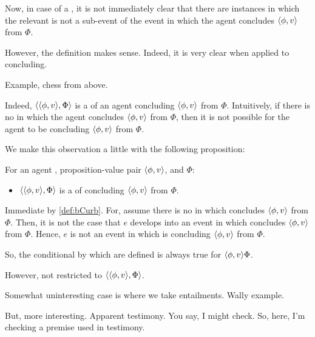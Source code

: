 \begin{note}
  Now, in case of a \bCurb{}, it is not immediately clear that there are instances in which the relevant \pevent{} is not a sub-event of the event in which the agent concludes \(\langle \phi, v \rangle\) from \(\Phi\).

  However, the definition makes sense.
  Indeed, it is very clear when applied to concluding.
\end{note}


\begin{note}
  Example, chess from above.
\end{note}

\begin{note}
  Indeed, \(\langle \langle \phi, v \rangle, \Phi \rangle\) is a \bCurb{} of an agent concluding \(\langle \phi, v \rangle\) from \(\Phi\).
  Intuitively, if there is no \pevent{} in which the agent concludes \(\langle \phi, v \rangle\) from \(\Phi\), then it is not possible for the agent to be concluding \(\langle \phi, v \rangle\) from \(\Phi\).

  We make this observation a little with the following proposition:

  \begin{proposition}
    For an agent \vAgent{}, proposition-value pair \(\langle \phi, v \rangle\), and \poP{} \(\Phi\):

    \begin{itemize}
    \item
      \(\langle \langle \phi, v \rangle, \Phi \rangle\) is a \bCurb{} of \vAgent{} concluding \(\langle \phi, v \rangle\) from \(\Phi\).
    \end{itemize}
    \begin{argument}
      Immediate by \autoref{def:bCurb}.
      For, assume there is no \pevent{} in which \vAgent{} concludes \(\langle \phi, v \rangle\) from \(\Phi\).
      Then, it is not the case that \(e\) develops into an event in which \vAgent{} concludes \(\langle \phi, v \rangle\) from \(\Phi\).
      Hence, \(e\) is not an event in which \vAgent{} is concluding \(\langle \phi, v \rangle\) from \(\Phi\).

      So, the conditional by which  are defined is always true for \(\langle \phi, v \rangle{\Phi}\).
    \end{argument}
  \end{proposition}
\end{note}

\begin{note}
  However, not restricted to \(\langle \langle \phi, v \rangle, \Phi \rangle\).

  Somewhat uninteresting case is where we take entailments.
  Wally example.

  But, more interesting.
  Apparent testimony.
  You say, I might check.
  So, here, I'm checking a premise used in testimony.
\end{note}

